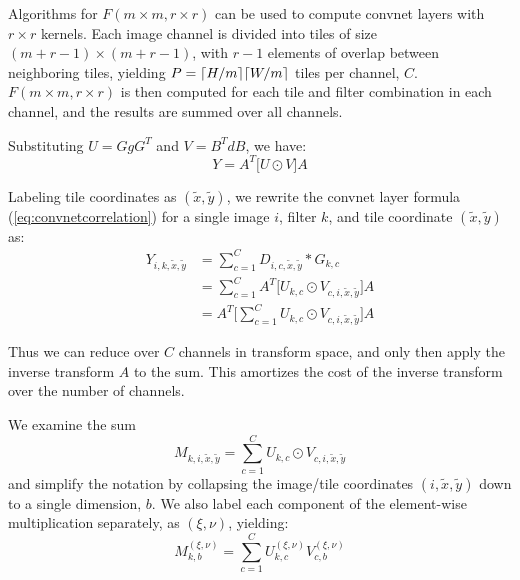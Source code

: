 \documentclass[10pt,twocolumn,letterpaper]{article}
\DeclarePairedDelimiter{\ceil}{\lceil}{\rceil}
\begin{document}
Algorithms for $F(m \times m, r \times r)$ can be used to compute convnet layers with $r \times r$ kernels. Each image channel is divided into tiles of size $(m+r-1)\times (m+r-1)$, with $r-1$ elements of overlap between neighboring tiles, yielding $P = \ceil{H/m} \ceil{W/m}$ tiles per channel, $C$. $F(m \times m, r \times r)$ is then computed for each tile and filter combination in each channel, and the results are summed over all channels. 

Substituting $U = G g G^T$ and $V = B^T d B$, we have:
\begin{equation}\label{eq:general_2D_convolution_UV}
Y = A^T \big[ U \odot V \big] A
\end{equation}

Labeling tile coordinates as $(\widetilde{x},\widetilde{y})$, we rewrite the convnet layer formula (\ref{eq:convnetcorrelation}) for a single image $i$, filter $k$, and tile coordinate $(\widetilde{x},\widetilde{y})$ as:
\begin{equation}\label{eq:fastconvnet}
\begin{split}
Y_{i, k, \widetilde{x},\widetilde{y}} &= \sum\limits_{c=1}^C D_{i,c,\widetilde{x},\widetilde{y}} \ast G_{k,c} \\
 &= \sum\limits_{c=1}^C A^T \bigg[ U_{k,c} \odot V_{c, i,\widetilde{x},\widetilde{y}} \bigg] A \\
 &= A^T \bigg[ \sum\limits_{c=1}^C U_{k,c} \odot V_{c, i,\widetilde{x},\widetilde{y}} \bigg] A
\end{split}
\end{equation}

Thus we can reduce over $C$ channels in transform space, and only then apply the inverse transform $A$ to the sum. This amortizes the cost of the inverse transform over the number of channels.

We examine the sum
\begin{equation}\label{eq:fastconvnet_sum}
M_{k,i,\widetilde{x},\widetilde{y}} =  \sum\limits_{c=1}^C U_{k,c} \odot V_{c,i,\widetilde{x},\widetilde{y}}
\end{equation}
and simplify the notation by collapsing the image/tile coordinates $(i,\widetilde{x},\widetilde{y})$ down to a single dimension, $b$. We also label each component of the element-wise multiplication separately, as $(\xi, \nu)$, yielding:
\begin{equation}
M_{k,b}^{(\xi,\nu)} = \sum\limits_{c=1}^C U^{(\xi,\nu)}_{k,c} V^{(\xi,\nu)}_{c,b}
\end{equation}
\end{document}
